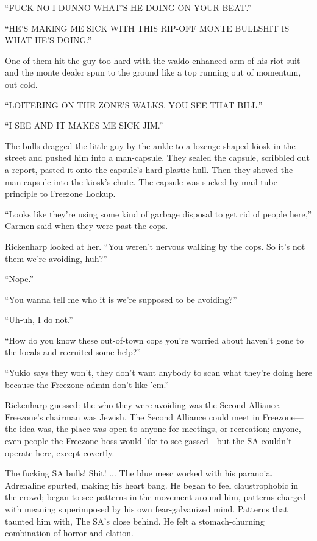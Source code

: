 ``FUCK NO I DUNNO WHAT'S HE DOING ON YOUR BEAT.''

``HE'S MAKlNG ME SICK WITH THIS RIP-OFF MONTE BULLSHIT IS WHAT HE'S DOING.''

One of them hit the guy too hard with the waldo-enhanced arm of his riot suit and the monte dealer spun to the ground like a top running out of momentum, out cold.

``LOITERING ON THE ZONE'S WALKS, YOU SEE THAT BILL.''

``I SEE AND IT MAKES ME SICK JIM.''

The bulls dragged the little guy by the ankle to a lozenge-shaped kiosk in the street and pushed him into a man-capsule. They sealed the capsule, scribbled out a report, pasted it onto the capsule's hard plastic hull. Then they shoved the man-capsule into the kiosk's chute. The capsule was sucked by mail-tube principle to Freezone Lockup.

``Looks like they're using some kind of garbage disposal to get rid of people here,'' Carmen said when they were past the cops.

Rickenharp looked at her. ``You weren't nervous walking by the cops. So it's not them we're avoiding, huh?''

``Nope.''

``You wanna tell me who it is we're supposed to be avoiding?''

``Uh-uh, I do not.''

``How do you know these out-of-town cops you're worried about haven't gone to the locals and recruited some help?''

``Yukio says they won't, they don't want anybody to scan what they're doing here because the Freezone admin don't like 'em.''

Rickenharp guessed: the who they were avoiding was the Second Alliance. Freezone's chairman was Jewish. The Second Alliance could meet in Freezone—the idea was, the place was open to anyone for meetings, or recreation; anyone, even people the Freezone boss would like to see gassed—but the SA couldn't operate here, except covertly.

The fucking SA bulls! Shit! ... The blue mesc worked with his paranoia. Adrenaline spurted, making his heart bang. He began to feel claustrophobic in the crowd; began to see patterns in the movement around him, patterns charged with meaning superimposed by his own fear-galvanized mind. Patterns that taunted him with, The SA's close behind. He felt a stomach-churning combination of horror and elation.

